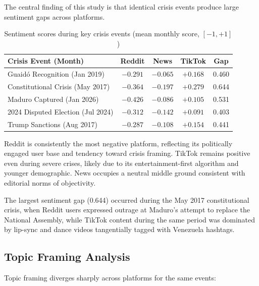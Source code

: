 \documentclass[12pt, letterpaper]{article}
\begin{document}
The central finding of this study is that identical crisis events produce large sentiment gaps across platforms.

\begin{table}[H]
  \centering
  \caption{Sentiment scores during key crisis events (mean monthly score, $[-1, +1]$)}
  \label{tab:sentiment_divergence}
  \begin{tabular}{lcccc}
    \toprule
    \textbf{Crisis Event (Month)} & \textbf{Reddit} & \textbf{News} & \textbf{TikTok} & \textbf{Gap} \\
    \midrule
    Guaid\'{o} Recognition (Jan 2019)     & $-0.291$ & $-0.065$ & $+0.168$ & 0.460 \\
    Constitutional Crisis (May 2017)       & $-0.364$ & $-0.197$ & $+0.279$ & 0.644 \\
    Maduro Captured (Jan 2026)             & $-0.426$ & $-0.086$ & $+0.105$ & 0.531 \\
    2024 Disputed Election (Jul 2024)      & $-0.312$ & $-0.142$ & $+0.091$ & 0.403 \\
    Trump Sanctions (Aug 2017)             & $-0.287$ & $-0.108$ & $+0.154$ & 0.441 \\
    \bottomrule
  \end{tabular}
\end{table}

Reddit is consistently the most negative platform, reflecting its politically engaged user base and tendency toward crisis framing. TikTok remains positive even during severe crises, likely due to its entertainment-first algorithm and younger demographic. News occupies a neutral middle ground consistent with editorial norms of objectivity.

The largest sentiment gap (0.644) occurred during the May 2017 constitutional crisis, when Reddit users expressed outrage at Maduro's attempt to replace the National Assembly, while TikTok content during the same period was dominated by lip-sync and dance videos tangentially tagged with Venezuela hashtags.

\subsection{Topic Framing Analysis}

Topic framing diverges sharply across platforms for the same events:
\end{document}
